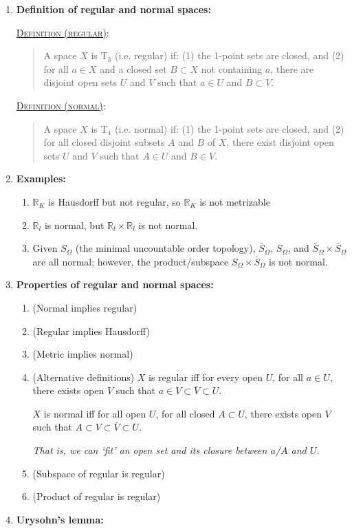 \documentclass[letterpaper, 12pt]{book}
\newcommand{\RR}{\mathbb{R}}
\newcommand{\Taxiom}[1]{T$_\text{#1}$}
\newcommand{\defn}[2]{\textsc{\underline{Definition (#1)}:}\begin{quote} #2\end{quote}}
\begin{document}
    \begin{enumerate}[resume]
    \item \textbf{Definition of regular and normal spaces:}

        \defn{regular}{A space $X$ is \Taxiom{3} (i.e. regular) if: (1) the 1-point sets are closed, and (2) for all $a\in X$ and a closed set $B\subset X$ not containing $a$, there are disjoint open sets $U$ and $V$ such that $a\in U$ and $B\subset V$.}

        \defn{normal}{A space $X$ is \Taxiom{4} (i.e. normal) if: (1) the 1-point sets are closed, and (2) for all closed disjoint subsets $A$ and $B$ of $X$, there exist disjoint open sets $U$ and $V$ such that $A\in U$ and $B\in V$.}
    \item \textbf{Examples:}
        \begin{enumerate}
        \item $\RR_K$ is Hausdorff but not regular, so $\RR_K$ is not metrizable
        \item $\RR_l$ is normal, but $\RR_l\times\RR_l$ is not normal.
        \item Given $S_\Omega$ (the minimal uncountable order topology), $\bar S_\Omega$, $S_\Omega$, and $\bar S_\Omega \times \bar S_\Omega$ are all normal; however, the product/subspace $S_\Omega \times \bar S_\Omega$ is not normal.
        \end{enumerate}
    \item \textbf{Properties of regular and normal spaces:}
        \begin{enumerate}
        \item (Normal implies regular)
        \item (Regular implies Hausdorff)
        \item (Metric implies normal)
        \item (Alternative definitions) $X$ is regular iff for every open $U$, for all $a\in U$, there exists open $V$ such that $a\in V \subset \bar V \subset U$.

            $X$ is normal iff for all open $U$, for all closed $A\subset U$, there exists open $V$ such that $A\subset V\subset \bar V \subset U$.

            \textit{That is, we can `fit' an open set and its closure between $a$/$A$ and $U$.}
        \item (Subspace of regular is regular)
        \item (Product of regular is regular)
        \end{enumerate}
    \item \textbf{Urysohn's lemma:}


\end{enumerate}
\end{document}
